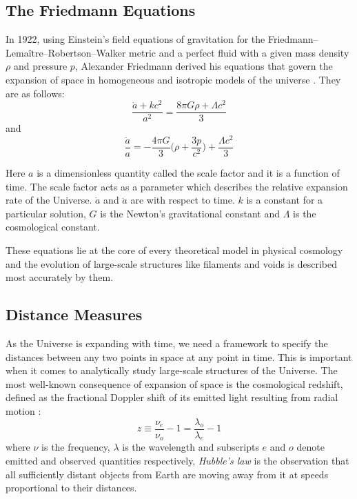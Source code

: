 \documentclass[fleqn,usenatbib]{mnras}
\begin{document}
\subsection{The Friedmann Equations}
In 1922, using Einstein's field equations of gravitation for the Friedmann–Lema\^{i}tre–Robertson–Walker metric and a perfect fluid with a given mass density $ \rho $ and pressure $ p $, Alexander Friedmann derived his equations that govern the expansion of space in homogeneous and isotropic models of the universe \citep{friedman_uber_1922}. They are as follows:
\begin{equation}\label{key}
	\dfrac{\dot{a} + kc^2}{a^2} = \dfrac{8 \pi G \rho + \Lambda c^2}{3}
\end{equation}
and
\begin{equation}\label{key}
	\dfrac{\ddot{a}}{a} = -\dfrac{4 \pi G}{3} \Bigg(\rho + \dfrac{3p}{c^2}\Bigg) + \dfrac{\Lambda c^2}{3}
\end{equation}
\label{sec:maths} %

Here $ a $ is a dimensionless quantity called the scale factor and it is a function of time. The scale factor acts as a parameter which describes the relative expansion rate of the Universe. $ \dot{a} $ and $ \ddot{a} $ are with respect to time. $ k $ is a constant for a particular solution, $ G $ is the Newton's gravitational constant and $ \Lambda $ is the cosmological constant.

These equations lie at the core of every theoretical model in physical cosmology and the evolution of large-scale structures like filaments and voids is described most accurately by them.

\subsection{Distance Measures}
As the Universe is expanding with time, we need a framework to specify the distances between any two points in space at any point in time. This is important when it comes to analytically study large-scale structures of the Universe. The most well-known consequence of expansion of space is the cosmological redshift, defined as the fractional Doppler shift of its emitted light resulting from radial motion \citep{hogg_distance_2000}:
\begin{equation}\label{key}
	z \equiv \dfrac{\nu_e}{\nu_o} - 1 = \dfrac{\lambda_o}{\lambda_e} - 1
\end{equation}
where $ \nu $ is the frequency, $ \lambda $ is the wavelength and subscripts $ e $ and $ o $ denote emitted and observed quantities respectively, 
\textit{Hubble's law} is the observation that all sufficiently distant objects from Earth are moving away from it at speeds proportional to their distances.
\end{document}
